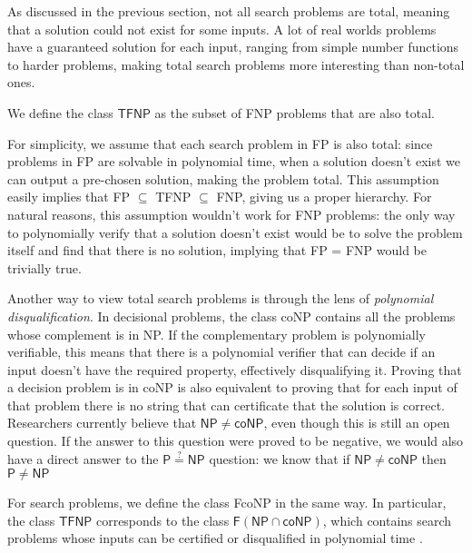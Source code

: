\newpage

As discussed in the previous section, not all search problems are total, meaning that a solution could not exist for some inputs. A lot of real worlds problems have a guaranteed solution for each input, ranging from simple number functions to harder problems, making total search problems more interesting than non-total ones.

\begin{definition}
    We define the class $\mathsf{TFNP}$ as the subset of \textsf{FNP} problems that are also total.
\end{definition}

For simplicity, we assume that each search problem in \textsf{FP} is also total: since problems in \textsf{FP} are solvable in polynomial time, when a solution doesn't exist we can output a pre-chosen  solution, making the problem total. This assumption easily implies that \textsf{FP} $\subseteq$ \textsf{TFNP} $\subseteq$ \textsf{FNP}, giving us a proper hierarchy. For natural reasons, this assumption wouldn't work for \textsf{FNP} problems: the only way to polynomially verify that a solution doesn't exist would be to solve the problem itself and find that there is no solution, implying that \textsf{FP} = \textsf{FNP} would be trivially true.

Another way to view total search problems is through the lens of \textit{polynomial disqualification}. In decisional problems, the class \textsf{coNP} contains all the problems whose complement is in \textsf{NP}. If the complementary problem is polynomially verifiable, this means that there is a polynomial verifier that can decide if an input doesn't have the required property, effectively disqualifying it. Proving that a decision problem is in \textsf{coNP} is also equivalent to proving that for each input of that problem there is no string that can certificate that the solution is correct. Researchers currently believe that $\mathsf{NP} \neq \mathsf{coNP}$, even though this is still an open question. If the answer to this question were proved to be negative, we would also have a direct answer to the $\mathsf{P} \stackrel{?}{=} \mathsf{NP}$ question: we know that if $\mathsf{NP} \neq \mathsf{coNP}$ then $\mathsf{P} \neq \mathsf{NP}$ \cite{complexity_arora_barak, sipser_computation}

For search problems, we define the class \textsf{FcoNP} in the same way. In particular, the class $\textsf{TFNP}$ corresponds to the class $\mathsf{F}(\mathsf{NP} \cap \mathsf{coNP})$, which contains search problems whose inputs can be certified or disqualified in polynomial time \cite{tfnp_f_np_conp}.

